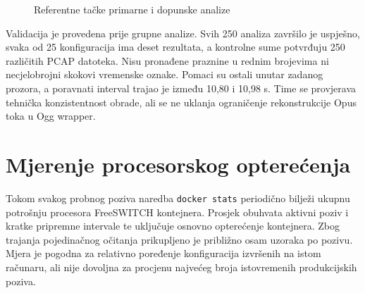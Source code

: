 \begin{figure}[htbp]
\centering
{}
\caption{Referentne tačke primarne i dopunske analize}
\label{fig:reference-boundaries}
\end{figure}

Validacija je provedena prije grupne analize. Svih 250 analiza završilo je uspješno, svaka od 25 konfiguracija ima deset rezultata, a kontrolne sume potvrđuju 250 različitih PCAP datoteka. Nisu pronađene praznine u rednim brojevima ni necjelobrojni skokovi vremenske oznake. Pomaci su ostali unutar zadanog prozora, a poravnati interval trajao je između 10,80 i 10,98 s. Time se provjerava tehnička konzistentnost obrade, ali se ne uklanja ograničenje rekonstrukcije Opus toka u Ogg wrapper.

\section{Mjerenje procesorskog opterećenja}

Tokom svakog probnog poziva naredba \texttt{docker stats} periodično bilježi ukupnu potrošnju procesora FreeSWITCH kontejnera. Prosjek obuhvata aktivni poziv i kratke pripremne intervale te uključuje osnovno opterećenje kontejnera. Zbog trajanja pojedinačnog očitanja prikupljeno je približno osam uzoraka po pozivu. Mjera je pogodna za relativno poređenje konfiguracija izvršenih na istom računaru, ali nije dovoljna za procjenu najvećeg broja istovremenih produkcijskih poziva.

